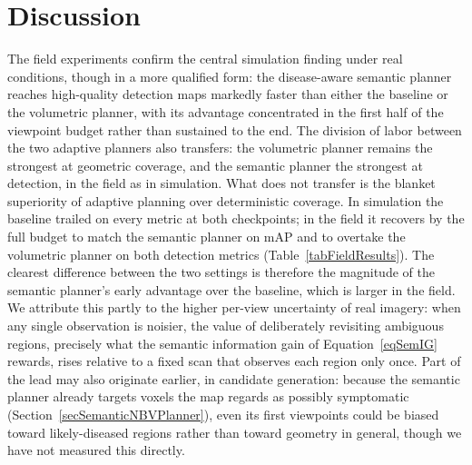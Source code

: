 \section{Discussion} \label{secFieldDiscussion}

The field experiments confirm the central simulation finding under real
conditions, though in a more qualified form: the disease-aware semantic
planner reaches high-quality detection maps markedly faster than either the
baseline or the volumetric planner, with its advantage concentrated in the
first half of the viewpoint budget rather than sustained to the end. The
division of labor between the two adaptive planners also transfers: the
volumetric planner remains the strongest at geometric coverage, and the
semantic planner the strongest at detection, in the field as in simulation.
What does not transfer is the blanket superiority of adaptive planning over
deterministic coverage. In simulation the baseline trailed on every metric at
both checkpoints; in the field it recovers by the full budget to match the
semantic planner on mAP and to overtake the volumetric planner on both
detection metrics (Table~\ref{tabFieldResults}). The clearest difference
between the two settings is therefore the magnitude of the semantic planner's
early advantage over the baseline, which is larger in the field. We attribute
this partly to the
higher per-view uncertainty of real imagery: when any single observation is
noisier, the value of deliberately revisiting ambiguous regions, precisely
what the semantic information gain of Equation~\ref{eqSemIG} rewards, rises
relative to a fixed scan that observes each region only once. Part of the
lead may also originate earlier, in candidate generation: because the
semantic planner already targets voxels the map regards as possibly
symptomatic (Section~\ref{secSemanticNBVPlanner}), even its first
viewpoints could be biased toward likely-diseased regions rather than
toward geometry in general, though we have not measured this directly.

